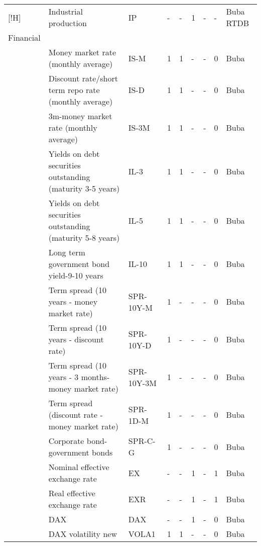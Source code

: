 \documentclass[10pt]{article}
\begin{document}
\begin{footnotesize}
\begin{longtable}{p{1.1in}|p{2.5in}|p{1in}|p{.1in}|p{.1in}|p{.1in}|p{.15in}|p{.1in}|p{.5in}}[!H]
& {\tiny{}Industrial production} & {\tiny{}IP} & {\tiny{}-} & {\tiny{}-} & {\tiny{}1} & {\tiny{}-} & {\tiny{}-} & {\tiny{}Buba RTDB}\tabularnewline
{\tiny{}Financial } &  &  &  &  &  &  &  & \tabularnewline
 & {\tiny{}Money market rate (monthly average)} & {\tiny{}IS-M} & {\tiny{}1} & {\tiny{}1} & {\tiny{}-} & {\tiny{}-} & {\tiny{}0} & {\tiny{}Buba}\tabularnewline
 & {\tiny{}Discount rate/short term repo rate (monthly average)} & {\tiny{}IS-D} & {\tiny{}1} & {\tiny{}1} & {\tiny{}-} & {\tiny{}-} & {\tiny{}0} & {\tiny{}Buba}\tabularnewline
 & {\tiny{}3m-money market rate (monthly average)} & {\tiny{}IS-3M} & {\tiny{}1} & {\tiny{}1} & {\tiny{}-} & {\tiny{}-} & {\tiny{}0} & {\tiny{}Buba}\tabularnewline
 & {\tiny{}Yields on debt securities outstanding (maturity 3-5 years)} & {\tiny{}IL-3} & {\tiny{}1} & {\tiny{}1} & {\tiny{}-} & {\tiny{}-} & {\tiny{}0} & {\tiny{}Buba}\tabularnewline
 & {\tiny{}Yields on debt securities outstanding (maturity 5-8 years)} & {\tiny{}IL-5} & {\tiny{}1} & {\tiny{}1} & {\tiny{}-} & {\tiny{}-} & {\tiny{}0} & {\tiny{}Buba}\tabularnewline
 & {\tiny{}Long term government bond yield-9-10 years} & {\tiny{}IL-10} & {\tiny{}1} & {\tiny{}1} & {\tiny{}-} & {\tiny{}-} & {\tiny{}0} & {\tiny{}Buba}\tabularnewline
 & {\tiny{}Term spread (10 years - money market rate)} & {\tiny{}SPR-10Y-M} & {\tiny{}1} & {\tiny{}-} & {\tiny{}-} & {\tiny{}-} & {\tiny{}0} & {\tiny{}Buba}\tabularnewline
 & {\tiny{}Term spread (10 years - discount rate)} & {\tiny{}SPR-10Y-D} & {\tiny{}1} & {\tiny{}-} & {\tiny{}-} & {\tiny{}-} & {\tiny{}0} & {\tiny{}Buba}\tabularnewline
 & {\tiny{}Term spread (10 years - 3 months-money market rate)} & {\tiny{}SPR-10Y-3M} & {\tiny{}1} & {\tiny{}-} & {\tiny{}-} & {\tiny{}-} & {\tiny{}0} & {\tiny{}Buba}\tabularnewline
 & {\tiny{}Term spread (discount rate - money market rate)} & {\tiny{}SPR-1D-M} & {\tiny{}1} & {\tiny{}-} & {\tiny{}-} & {\tiny{}-} & {\tiny{}0} & {\tiny{}Buba}\tabularnewline
 & {\tiny{}Corporate bond-government bonds} & {\tiny{}SPR-C-G} & {\tiny{}1} & {\tiny{}-} & {\tiny{}-} & {\tiny{}-} & {\tiny{}0} & {\tiny{}Buba}\tabularnewline
 & {\tiny{}Nominal effective exchange rate} & {\tiny{}EX} & {\tiny{}-} & {\tiny{}-} & {\tiny{}1} & {\tiny{}-} & {\tiny{}1} & {\tiny{}Buba}\tabularnewline
 & {\tiny{}Real effective exchange rate} & {\tiny{}EXR} & {\tiny{}-} & {\tiny{}-} & {\tiny{}1} & {\tiny{}-} & {\tiny{}1} & {\tiny{}Buba}\tabularnewline
 & {\tiny{}DAX} & {\tiny{}DAX} & {\tiny{}-} & {\tiny{}-} & {\tiny{}1} & {\tiny{}-} & {\tiny{}0} & {\tiny{}Buba}\tabularnewline
 & {\tiny{}DAX volatility new} & {\tiny{}VOLA1} & {\tiny{}1} & {\tiny{}1} & {\tiny{}-} & {\tiny{}-} & {\tiny{}0} & {\tiny{}Buba}\tabularnewline

\end{longtable}
\end{footnotesize}
\end{document}
